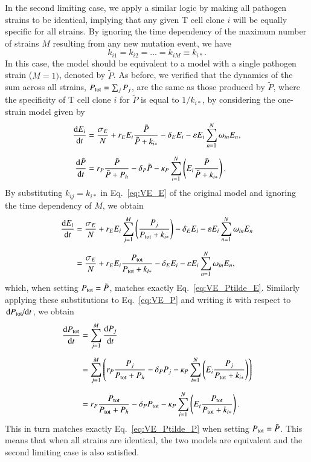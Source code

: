 In the second limiting case, we apply a similar logic by making all pathogen strains to be identical, implying that any given T cell clone $i$ will be equally specific for all strains. By ignoring the time dependency of the maximum number of strains $M$ resulting from any new mutation event, we have
%
\begin{equation*}
   k_{i1} = k_{i2} = ... =  k_{iM} \equiv k_{i*}.
\end{equation*}
%
In this case, the model should be equivalent to a model with a single pathogen strain ($M=1)$, denoted by $\tilde{P}$. As before, we verified that the dynamics of the sum across all strains, $P_{\textup{tot}} = \sum_j P_j$, are the same as those produced by $\tilde{P}$, where the specificity of T cell clone $i$ for $\tilde{P}$ is equal to $1/k_{i*}$, by considering the one-strain model given by
%
\begin{align}
    \dv{E_i}{t} &= \frac{\sigma_E}{N} + r_E E_i \frac{\tilde{P}}{\tilde{P} + k_{i*}} -\delta_E E_i - \varepsilon E_i \sum_{n=1}^N \omega_{in} E_n, \label{eq:VE_Ptilde_E} \\[0.5em]
    \dv{\tilde{P}}{t} &= r_P \frac{\tilde{P}}{\tilde{P}+P_h} - \delta_P \tilde{P} - \kappa_P \sum_{i=1}^{N}\left(E_i \frac{\tilde{P}}{\tilde{P} + k_{i*}} \right). \label{eq:VE_Ptilde_P}
\end{align}
%
By substituting $k_{ij} = k_{i*}$ in Eq.~\eqref{eq:VE_E} of the original model and ignoring the time dependency of $M$,  we obtain
%
\begin{align*}
    \dv{E_i}{t} &= \frac{\sigma_E}{N} + r_E E_i \sum_{j=1}^{M}\left(\frac{P_j}{P_\textup{tot} + k_{i*}} \right) -\delta_E E_i - \varepsilon E_i \sum_{n=1}^N \omega_{in} E_n \\[0.5em]
    &= \frac{\sigma_E}{N} + r_E E_i \frac{P_\textup{tot}}{P_\textup{tot} + k_{i*}} -\delta_E E_i - \varepsilon E_i \sum_{n=1}^N \omega_{in} E_n,
\end{align*}
%
which, when setting $P_{\textup{tot}} = \tilde{P}$, matches exactly Eq.~\eqref{eq:VE_Ptilde_E}. Similarly applying these substitutions to Eq.~\eqref{eq:VE_P} and writing it with respect to $\dv*{P_{\textup{tot}}}{t}$, we obtain
%
\begin{align*}
    \dv{P_{\textup{tot}}}{t} &= \sum_{j=1}^{M} \dv{P_j}{t} \\[0.5 em]
    &= \sum_{j=1}^{M} \left( r_P \frac{P_j}{P_{\textup{tot}}+P_h} - \delta_P P_j - \kappa_P \sum_{i=1}^{N}\left(E_i \frac{P_j}{P_{\textup{tot}} + k_{i*}} \right) \right) \\[0.5em]
    &= r_P \frac{P_{\textup{tot}}}{P_{\textup{tot}}+P_h} - \delta_P P_{\textup{tot}} - \kappa_P \sum_{i=1}^{N}\left(E_i \frac{P_{\textup{tot}}}{P_{\textup{tot}} + k_{i*}} \right).
\end{align*}
%
This in turn matches exactly Eq.~\eqref{eq:VE_Ptilde_P} when setting $P_{\textup{tot}} = \tilde{P}$. This means that when all strains are identical, the two models are equivalent and the second limiting case is also satisfied.

